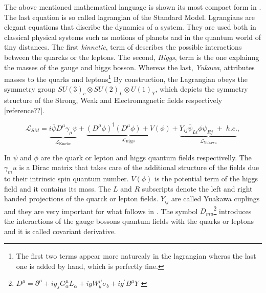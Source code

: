 The above mentioned mathematical language is shown its most compact form in . The last equation is so called lagrangian
of the Standard Model. Lgrangians are elegant equations that discribe the dynamics of a system. They are used both in classical physical
systems such as motions of planets and in the quantum world of tiny distances. The first {\it kinnetic}, term of 
describes the possible interactions between the quarcks or the leptons. The second, {\it Higgs}, term is the one explainng the masses
of the gauge and higgs bosson. Whereas the last, {\it Yukawa}, attributes masses to the quarks and leptons\footnote{The first two terms
appear more naturealy in the lagrangian wheras the last one is added by hand, which is perfectly fine.}
By construction, the Lagrangian obeys the symmetry group $SU(3)_c\otimes SU(2)_L\otimes U(1)_Y$, which depicts the symmetry structure
of the Strong, Weak and Electromagnetic fields respectively [reference??].


\begin{equation}
\mathscr{L}_{SM} = \underbrace{i \bar\psi D^{\mu} \gamma _{\mu} \psi}_{\mathscr{L}_{\text{Kinetic}}} +
                   \underbrace{(D^\mu\phi)^{\dagger} (D^\mu\phi) + V(\phi)}_{\mathscr{L}_{\text{Higgs}}} +
                   \underbrace{Y_{ij}\bar\psi_{Li}\phi\psi_{Rj} \; + \; h.c.}_{\mathscr{L}_{\text{Yukawa}}},
\label{lagrangian}
\end{equation}

In  $\psi$ and $\phi$ are the quark or lepton and higgs quantum fields respectivelly. The $\gamma_mu$ is a Dirac matrix
that takes care of the additional structure of the fields due to their intrinsic spin quantum number. $V(\phi)$ is the potential term of the
higgs field and it contains its mass. The $L$ and $R$ subscripts denote the left and right handed projections of the quarck or lepton fields.
$Y_{ij}$ are called Yuakawa cuplings and they are very important for what follows in \secref{}.
The symbol $D_{mu}$\footnote{$D^\mu=\partial ^\mu + ig_sG_{\alpha}^\mu L_{\alpha} +  igW_b^\mu\sigma_b + ig^\prime B^\mu Y$ \cite{covariant derivative??}}
introduces the interactions of the gauge bossons quantum fields with the quarks or leptons and it is called covariant derivative.

